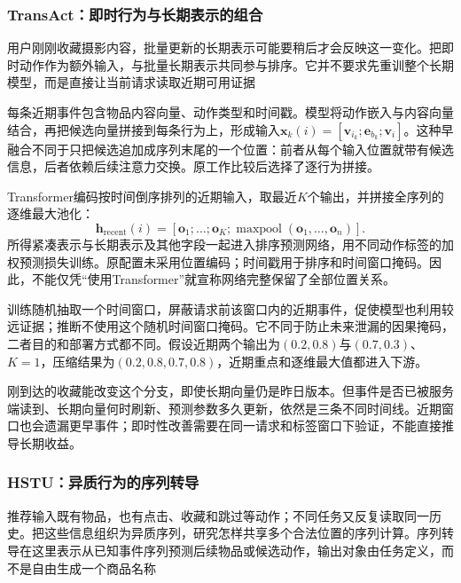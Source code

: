 \subsubsection{TransAct：即时行为与长期表示的组合}
\label{sec:rs-transact}

用户刚刚收藏摄影内容，批量更新的长期表示可能要稍后才会反映这一变化。把即时动作作为额外输入，与批量长期表示共同参与排序。它并不要求先重训整个长期模型，而是直接让当前请求读取近期可用证据

每条近期事件包含物品内容向量、动作类型和时间戳。模型将动作嵌入与内容向量结合，再把候选向量拼接到每条行为上，形成输入$\bm{x}_k(i)=[\bm{v}_{i_k};\bm{e}_{b_k};\bm{v}_i]$。这种早融合不同于只把候选追加成序列末尾的一个位置：前者从每个输入位置就带有候选信息，后者依赖后续注意力交换。原工作比较后选择了逐行为拼接。

Transformer编码按时间倒序排列的近期输入，取最近$K$个输出，并拼接全序列的逐维最大池化：
\begin{equation}
  \bm{h}_{\mathrm{recent}}(i)=
    [\bm{o}_1;\ldots;\bm{o}_K;
      \operatorname{maxpool}(\bm{o}_1,\ldots,\bm{o}_n)].
  \label{eq:rs-transact-compress}
\end{equation}
所得紧凑表示与长期表示及其他字段一起进入排序预测网络，用不同动作标签的加权预测损失训练。原配置未采用位置编码；时间戳用于排序和时间窗口掩码。因此，不能仅凭“使用Transformer”就宣称网络完整保留了全部位置关系。

训练随机抽取一个时间窗口，屏蔽请求前该窗口内的近期事件，促使模型也利用较远证据；推断不使用这个随机时间窗口掩码。它不同于防止未来泄漏的因果掩码，二者目的和部署方式都不同。假设近期两个输出为$(0.2,0.8)$与$(0.7,0.3)$、$K=1$，压缩结果为$(0.2,0.8,0.7,0.8)$，近期重点和逐维最大值都进入下游。

刚到达的收藏能改变这个分支，即使长期向量仍是昨日版本。但事件是否已被服务端读到、长期向量何时刷新、预测参数多久更新，依然是三条不同时间线。近期窗口也会遗漏更早事件；即时性改善需要在同一请求和标签窗口下验证，不能直接推导长期收益。

\subsubsection{HSTU：异质行为的序列转导}
\label{sec:rs-hstu}

推荐输入既有物品，也有点击、收藏和跳过等动作；不同任务又反复读取同一历史。把这些信息组织为异质序列，研究怎样共享多个合法位置的序列计算。序列转导在这里表示从已知事件序列预测后续物品或候选动作，输出对象由任务定义，而不是自由生成一个商品名称

